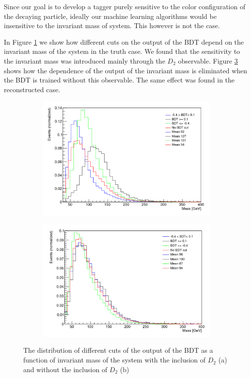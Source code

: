 \documentclass[10pt,a4paper]{book}
\begin{document}
Since our goal is to develop a tagger purely sensitive to the color configuration of the decaying particle, ideally our machine learning algorithms would be insensitive to the invariant mass of system. This however is not the case.

In Figure \ref{bdt with d2} we show how different cuts on the output of the BDT depend on the invariant mass of the system in the truth case. We found that the sensitivity to the invariant mass was introduced mainly through the $D_2$ observable. Figure \ref{bdt w/o d2} shows how the dependence of the output of the invariant mass is eliminated when the BDT is trained without this observable. The same effect was found in the reconstructed case.

\begin{figure}[h]
\begin{subfigure}{1.0\textwidth}
\centering
\includegraphics[scale=0.35]{ch4_images/bdt_with_d2}
\caption{}
\label{bdt with d2}
\end{subfigure}
\begin{subfigure}{1.0\textwidth}
\centering
\includegraphics[scale=0.35]{ch4_images/bdt_wo_d2}
\caption{}
\label{bdt w/o d2}
\end{subfigure}
\caption{The distribution of different cuts of the output of the BDT as a function of invariant mass of the system with the inclusion of $D_2$ (a) and without the inclusion of $D_2$ (b)}
\end{figure} 
\end{document}

